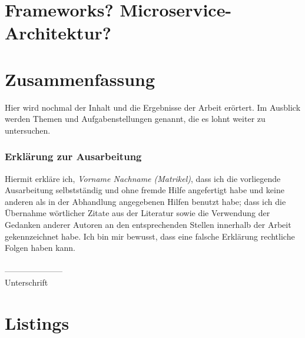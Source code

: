 \documentclass[fleqn,10.5pt,ngerman]{SelfArx}
\begin{document}
\section{Frameworks? Microservice-Architektur?}

\section{Zusammenfassung}
Hier wird nochmal der Inhalt und die Ergebnisse der Arbeit erörtert. Im Ausblick werden Themen und Aufgabenstellungen genannt, die es lohnt weiter zu untersuchen.

\newpage
\clearpage
\appendix
\cleardoublepage
\onecolumn





\subsubsection*{Erklärung zur Ausarbeitung}
Hiermit erkläre ich, {\it Vorname Nachname (Matrikel)}, dass ich die vorliegende Ausarbeitung selbstständig und ohne fremde Hilfe angefertigt habe und keine anderen als in der Abhandlung angegebenen Hilfen benutzt habe; dass ich die Übernahme wörtlicher Zitate aus der Literatur sowie die Verwendung der Gedanken anderer Autoren an den entsprechenden Stellen innerhalb der Arbeit gekennzeichnet habe. Ich bin mir bewusst, dass eine falsche Erklärung rechtliche Folgen haben kann.\\ \\
--------------------- \\
Unterschrift


\clearpage
\appendix
\cleardoublepage
\newpage
\onecolumn

\section{Listings}

\newpage

\newpage

\end{document}
